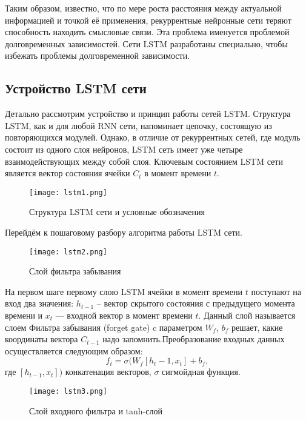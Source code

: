 \documentclass{article}
\begin{document}
Таким образом, известно, что по мере роста расстояния между актуальной информацией и точкой её применения, рекуррентные нейронные сети теряют способность
находить смысловые связи. Эта проблема именуется проблемой долговременных зависимостей. Сети LSTM разработаны специально, чтобы избежать проблемы долговременной зависимости.

\subsection{Устройство LSTM сети}

Детально рассмотрим устройство и принцип работы сетей LSTM. Структура LSTM,
как и для любой RNN сети, напоминает цепочку, состоящую из повторяющихся модулей. Однако, в отличие от рекуррентных сетей, где модуль состоит из одного слоя нейронов, LSTM сеть имеет уже четыре взаимодействующих между собой слоя. Ключевым состоянием LSTM сети является вектор состояния ячейки $C_t$ в момент времени $t$.

\begin{figure}[H]
	
	        \texttt{[image: lstm1.png]}
	        \caption{ Структура LSTM сети и условные обозначения}
	    \end{figure}

Перейдём к пошаговому разбору алгоритма работы LSTM сети. 

 \begin{figure}[H]
	    
	        \texttt{[image: lstm2.png]}
	        \caption{Слой фильтра забывания}
	    \end{figure}
     
На первом шаге первому слою LSTM ячейки в момент времени $t$ поступают на вход два значения: $h_{t-1}$ -- вектор скрытого состояния с предыдущего момента времени и $x_t$ — входной вектор в момент времени $t$. 
Данный слой называется слоем Фильтра забывания (forget gate) c 
параметром $W_f$, $b_f$
решает, какие координаты вектора $C_{t-1}$ надо запомнить.Преобразование входных данных
осуществляется следующим образом:
$$f_t=\sigma(W_f[h_t-1,x_t]+b_f,$$
где $[h_{t-1},x_t])$ конкатенация векторов,
$\sigma$ сигмойдная функция.

 \begin{figure}[H]
	        \centering
	        \texttt{[image: lstm3.png]}
	         \caption{Слой входного фильтра и tanh-слой}
	    \end{figure}
     
\end{document}
